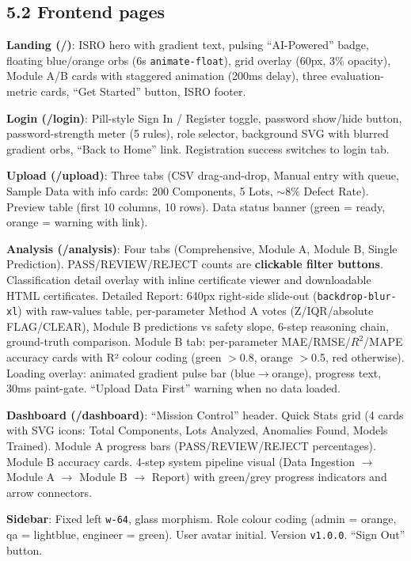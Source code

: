 \documentclass[11pt,a4paper]{article}
\newcommand{\code}[1]{\texttt{\small #1}}
\begin{document}
\subsection*{5.2 Frontend pages}

\noindent\textbf{Landing (/)}: ISRO hero with gradient text, pulsing ``AI-Powered'' badge,
floating blue/orange orbs (6s \code{animate-float}), grid overlay (60px, 3\% opacity),
Module A/B cards with staggered animation (200ms delay), three evaluation-metric cards,
``Get Started'' button, ISRO footer.

\noindent\textbf{Login (/login)}: Pill-style Sign In / Register toggle, password show/hide
button, password-strength meter (5 rules), role selector, background SVG with blurred gradient
orbs, ``Back to Home'' link. Registration success switches to login tab.

\noindent\textbf{Upload (/upload)}: Three tabs (CSV drag-and-drop, Manual entry with queue,
Sample Data with info cards: 200 Components, 5 Lots, $\sim$8\% Defect Rate). Preview table
(first 10 columns, 10 rows). Data status banner (green = ready, orange = warning with link).

\noindent\textbf{Analysis (/analysis)}: Four tabs (Comprehensive, Module A, Module B, Single
Prediction). PASS/REVIEW/REJECT counts are \textbf{clickable filter buttons}. Classification
detail overlay with inline certificate viewer and downloadable HTML certificates. Detailed
Report: 640px right-side slide-out (\code{backdrop-blur-xl}) with raw-values table, per-parameter
Method A votes (Z/IQR/absolute FLAG/CLEAR), Module B predictions vs safety slope, 6-step
reasoning chain, ground-truth comparison. Module B tab: per-parameter MAE/RMSE/$R^2$/MAPE
accuracy cards with R² colour coding (green $>$0.8, orange $>$0.5, red otherwise). Loading
overlay: animated gradient pulse bar (blue$\rightarrow$orange), progress text, 30ms paint-gate.
``Upload Data First'' warning when no data loaded.

\noindent\textbf{Dashboard (/dashboard)}: ``Mission Control'' header. Quick Stats grid (4 cards
with SVG icons: Total Components, Lots Analyzed, Anomalies Found, Models Trained). Module A
progress bars (PASS/REVIEW/REJECT percentages). Module B accuracy cards. 4-step system pipeline
visual (Data Ingestion $\rightarrow$ Module A $\rightarrow$ Module B $\rightarrow$ Report) with
green/grey progress indicators and arrow connectors.

\noindent\textbf{Sidebar}: Fixed left \code{w-64}, glass morphism. Role colour coding (admin =
orange, qa = lightblue, engineer = green). User avatar initial. Version \code{v1.0.0}.
``Sign Out'' button.
\end{document}
